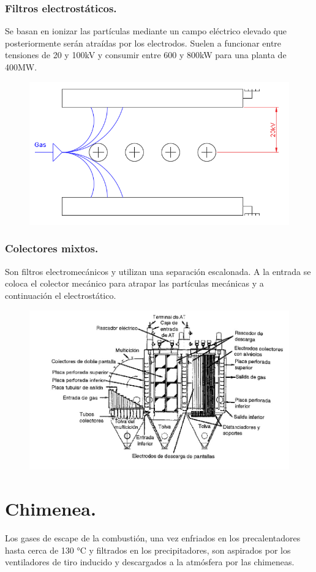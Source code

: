 \subsubsection{Filtros electrostáticos.}
Se basan en ionizar las partículas mediante un campo eléctrico elevado que posteriormente serán atraídas por los electrodos. Suelen a funcionar entre tensiones de 20 y 100kV y consumir entre 600 y 800kW para una planta de 400MW.
\begin{figure}[H]
	\centering
	\includegraphics[width=0.7\linewidth]{res/tema2/filtroelectrostatico}
	\label{fig:filtroelectrostatico}
\end{figure} 
\subsubsection{Colectores mixtos.}
Son filtros electromecánicos y utilizan una separación escalonada. A la entrada se coloca el colector mecánico para atrapar las partículas mecánicas y a continuación el electrostático.
\begin{figure}[H]
	\centering
	\includegraphics[width=0.7\linewidth]{res/tema10/colectorMixto}
	\label{fig:colectormixto}
\end{figure}

\section{Chimenea.}
Los gases de escape de la combustión, una vez enfriados en los precalentadores hasta cerca de 130 °C
y filtrados en los precipitadores, son aspirados por los ventiladores de tiro inducido y descargados a la
atmósfera por las chimeneas.


